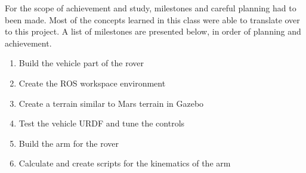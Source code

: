 For the scope of achievement and study, milestones and careful planning had to been made. Most of the concepts learned in this class were able to translate over to this project. 
A list of milestones are presented below, in order of planning and achievement. 

\begin{enumerate}
	\item Build the vehicle part of the rover
	\item Create the ROS workspace environment
	\item Create a terrain similar to Mars terrain in Gazebo
	\item Test the vehicle URDF and tune the controls
	\item Build the arm for the rover
	\item Calculate and create scripts for the kinematics of the arm
\end{enumerate}